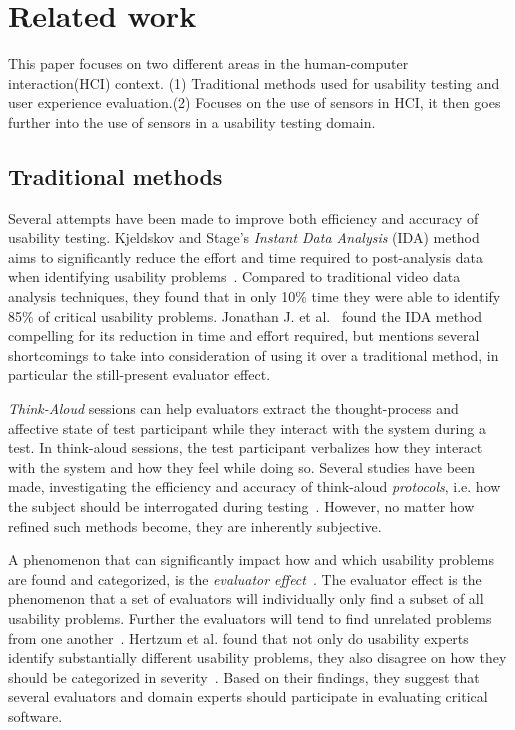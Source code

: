 \section{Related work}
This paper focuses on two different areas in the human-computer interaction(HCI) context. (1) Traditional methods used for usability testing and user experience evaluation.(2) Focuses on the use of sensors in HCI, it then goes further into the use of sensors in a usability testing domain.

\subsection{Traditional methods} %
Several attempts have been made to improve both efficiency and accuracy of
usability testing. Kjeldskov and Stage's \textit{Instant Data
Analysis} (IDA) method aims to significantly reduce the effort and time required
to post-analysis data when identifying usability
problems~\cite{instant_data_analysis}. Compared to traditional video data
analysis techniques, they found that in only 10\% time they were able to
identify 85\% of critical usability problems. Jonathan J. et
al.~\cite{use_of_TA_and_IDA} found the IDA
method compelling for its reduction in time and effort required, but mentions
several shortcomings to take into consideration of using it over a traditional
method, in particular the still-present evaluator effect.

\textit{Think-Aloud} sessions can help evaluators extract the thought-process
and affective state of test participant while they interact with the system
during a test. In think-aloud sessions, the test participant verbalizes how
they interact with the system and how they feel while doing so.  Several studies
have been made, investigating the efficiency and accuracy of think-aloud
\textit{protocols}, i.e. how the subject should be interrogated during
testing~\cite{two_think_aloud_protocols_study}. However, no matter how refined
such methods become, they are inherently subjective.

A phenomenon that can significantly impact how and which usability problems are
found and categorized, is the \textit{evaluator effect}~\cite{eval_effect}.
The evaluator effect is the phenomenon that a set of evaluators will individually only find a subset of all usability problems.
Further the evaluators will tend to find unrelated problems from one another~\cite{eval_effect}.
Hertzum et al. found that not only do
usability experts identify substantially different usability problems, they also
disagree on how they should be categorized in
severity~\cite{eval_effect_research}. Based on their findings, they suggest that
several evaluators and domain experts should participate in evaluating critical
software.

